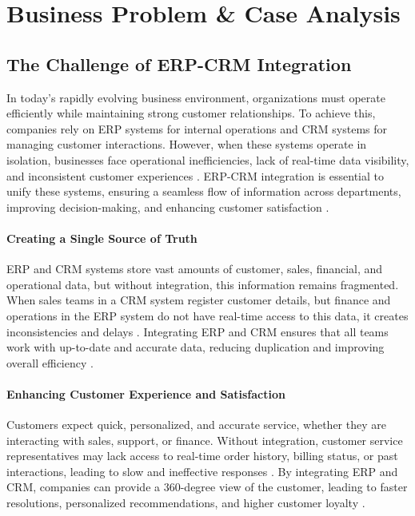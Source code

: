 
\chapter{Business Problem \& Case Analysis}
\section{The Challenge of ERP-CRM Integration}

In today’s rapidly evolving business environment, organizations must operate efficiently while maintaining strong customer relationships. To achieve this, companies rely on ERP systems for internal operations and CRM systems for managing customer interactions. However, when these systems operate in isolation, businesses face operational inefficiencies, lack of real-time data visibility, and inconsistent customer experiences \cite{ruivo2014}. ERP-CRM integration is essential to unify these systems, ensuring a seamless flow of information across departments, improving decision-making, and enhancing customer satisfaction \cite{shaul2013}.

\subsubsection{Creating a Single Source of Truth}
ERP and CRM systems store vast amounts of customer, sales, financial, and operational data, but without integration, this information remains fragmented. When sales teams in a CRM system register customer details, but finance and operations in the ERP system do not have real-time access to this data, it creates inconsistencies and delays \cite{hendricks2007}. Integrating ERP and CRM ensures that all teams work with up-to-date and accurate data, reducing duplication and improving overall efficiency \cite{gebreyes2018}.

\subsubsection{Enhancing Customer Experience and Satisfaction}
Customers expect quick, personalized, and accurate service, whether they are interacting with sales, support, or finance. Without integration, customer service representatives may lack access to real-time order history, billing status, or past interactions, leading to slow and ineffective responses \cite{devarashetty2023}. By integrating ERP and CRM, companies can provide a 360-degree view of the customer, leading to faster resolutions, personalized recommendations, and higher customer loyalty \cite{mestre2015}.

